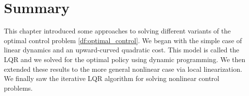 \documentclass[\main/main]{subfiles}
\begin{document}
\fi

\section{Summary}

This chapter introduced some approaches to solving different variants of the optimal control problem \eqref{df:optimal_control}.
We began with the simple case of linear dynamics and an upward-curved quadratic cost. This model is called the LQR and we solved for the optimal policy using dynamic programming. We then extended these results to the more general nonlinear case via local linearization. We finally saw the iterative LQR algorithm for solving nonlinear control problems.
\end{document}
